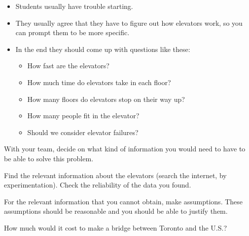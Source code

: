 \begin{annotation}
	\begin{notes}
		\begin{itemize}
			\item Students usually have trouble starting. 
			\item They usually agree that they have to figure out how elevators work, so you can prompt them to be more specific. 
			
			\item In the end they should come up with questions like these:
			\begin{itemize}
				\item How fast are the elevators?
				\item How much time do elevators take in each floor?
				\item How many floors do elevators stop on their way up?
				\item How many people fit in the elevator?
				\item Should we consider elevator failures?
			\end{itemize}
		\end{itemize}	
	\end{notes}
\end{annotation}
\begin{parts} 
	\item With your team, decide on what kind of information you would need to have to be able to solve this problem.

	\item Find the relevant information about the elevators (search the internet, by experimentation). Check the reliability of the data you found.

	\item For the relevant information that you cannot obtain, make assumptions. These assumptions should be reasonable and you should be able to justify them.
\end{parts}




\bookonlynewpage

\begin{notslides}

\hfill

\bookonlynewpage
\end{notslides}

\question How much would it cost to make a bridge between Toronto and the U.S.?














